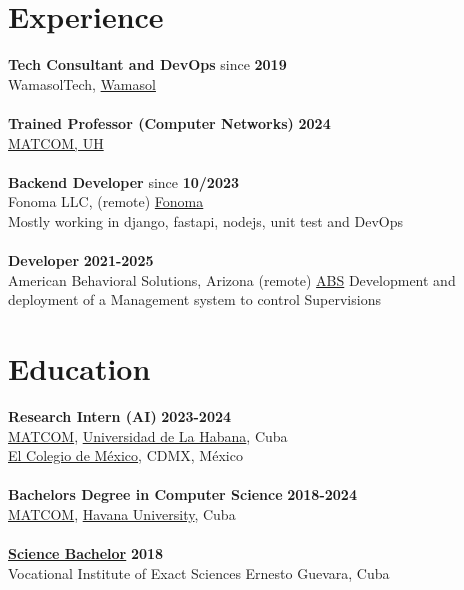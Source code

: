 \documentclass{article}
\begin{document}
\section*{Experience}
    \textbf{Tech Consultant and DevOps} \hfill since \textbf{ 2019 }\\ 
    WamasolTech, 
    \href{https://wamasol.com}{Wamasol}\\
    \vspace{0.1cm}\\
    \textbf{Trained Professor (Computer Networks)} \hfill \textbf{ 2024}\\ 
    \href{https://matcom.uh.cu}{MATCOM, UH}\\
    \vspace{0.1cm}\\
    \textbf{Backend Developer} \hfill since \textbf{10/2023}\\ 
    Fonoma LLC, (remote)
    \href{https://fonoma.com}{Fonoma}\\
    Mostly working in django, fastapi, nodejs, unit test and DevOps\\
    \vspace{0.1cm}\\
    \textbf{Developer} \hfill \textbf{2021-2025}\\ 
    American Behavioral Solutions, Arizona (remote)
    \href{https://americanbehavioralsolutions.com}{ABS}
    Development and deployment of a Management system to control Supervisions

\section*{Education}
\textbf{Research Intern (AI)} \hfill \textbf{2023-2024}\\
\href{https://matcom.in/}{MATCOM}, \href{https://uh.cu}{Universidad de La Habana}, Cuba\\
\href{https://www.colmex.mx/}{El Colegio de M\'exico}, CDMX, M\'exico\\
\vspace{0.1cm}\\
\textbf{Bachelors Degree in Computer Science} \hfill \textbf{2018-2024}\\
\href{https://matcom.in/}{MATCOM}, \href{https://uh.cu}{Havana University}, Cuba\\
\vspace{0.1cm}\\
\textbf{\hyperref[sec:bachelor]{Science Bachelor}} \hfill \textbf{2018}\\
Vocational Institute of Exact Sciences  Ernesto Guevara, Cuba
\end{document}
